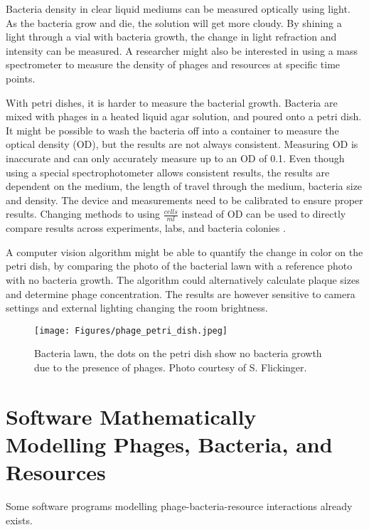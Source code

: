 Bacteria density in clear liquid mediums can be measured optically using light. 
As the bacteria grow and die, the solution will get more cloudy. 
By shining a light through a vial with bacteria growth, the change in light refraction and intensity can be measured. 
A researcher might also be interested in using a mass spectrometer to measure the density of phages and resources at specific time points. 

With petri dishes, it is harder to measure the bacterial growth. 
Bacteria are mixed with phages in a heated liquid agar solution, and poured onto a petri dish. 
It might be possible to wash the bacteria off into a container to measure the optical density (OD), but the results are not always consistent. 
Measuring OD is inaccurate and can only accurately measure up to an OD of 0.1. Even though using a special spectrophotometer allows consistent results, the results are dependent on the medium, the length of travel through the medium, bacteria size and density. 
The device and measurements need to be calibrated to ensure proper results. 
Changing methods to using $\frac{\textit{cells}}{\textit{ml}}$ instead of OD can be used to directly compare results across experiments, labs, and bacteria colonies \cite{miraEstimatingMicrobialPopulation2022}. 

A computer vision algorithm might be able to quantify the change in color on the petri dish, by comparing the photo of the bacterial lawn with a reference photo with no bacteria growth. 
The algorithm could alternatively calculate plaque sizes and determine phage concentration. 
The results are however sensitive to camera settings and external lighting changing the room brightness.  

\begin{figure}[h!]
    \texttt{[image: Figures/phage\_petri\_dish.jpeg]}
    \centering
    \caption{
        Bacteria lawn, the dots on the petri dish show no bacteria growth due to the presence of phages. 
        Photo courtesy of S. Flickinger. 
    }
    \label{fig:phage_petri_dish}
\end{figure}

\section{Software Mathematically Modelling Phages, Bacteria, and Resources}
Some software programs modelling phage-bacteria-resource interactions already exists. 
